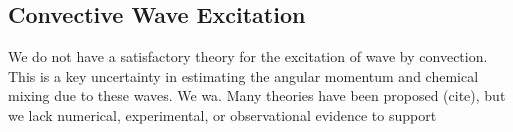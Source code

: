 {\color{purple}
\subsection{Convective Wave Excitation}
}

We do not have a satisfactory theory for the excitation of wave by convection. This is a key uncertainty in estimating the angular momentum and chemical mixing due to these waves. We wa. Many theories have been proposed (cite), but we lack numerical, experimental, or observational evidence to support  
